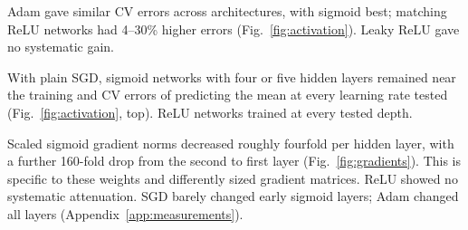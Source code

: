 \documentclass[aps,prb,reprint,superscriptaddress,nofootinbib,longbibliography,floatfix]{revtex4-2}
\begin{document}
Adam gave similar CV errors across architectures, with sigmoid best; matching ReLU networks had 4--30\% higher errors (Fig.~\ref{fig:activation}). Leaky ReLU gave no systematic gain.

With plain SGD, sigmoid networks with four or five hidden layers remained near the training and CV errors of predicting the mean at every learning rate tested (Fig.~\ref{fig:activation}, top). ReLU networks trained at every tested depth.

Scaled sigmoid gradient norms decreased roughly fourfold per hidden layer, with a further 160-fold drop from the second to first layer (Fig.~\ref{fig:gradients}). This is specific to these weights and differently sized gradient matrices. ReLU showed no systematic attenuation. SGD barely changed early sigmoid layers; Adam changed all layers (Appendix~\ref{app:measurements}).
\end{document}
